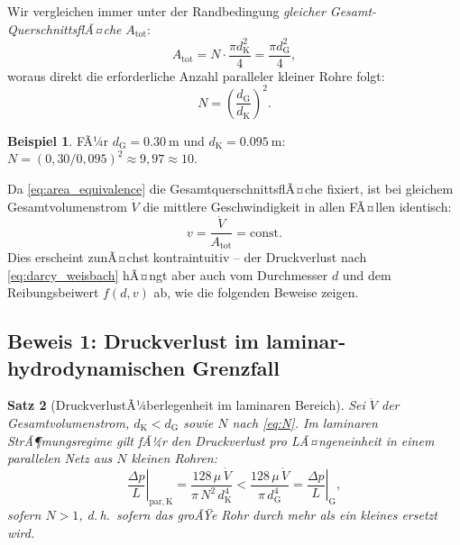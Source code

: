 ﻿\documentclass[12pt,a4paper,twoside]{article}
\theoremstyle{plain}
\newtheorem{theorem}{Satz}[section]
\theoremstyle{definition}
\newtheorem{example}[theorem]{Beispiel}
\theoremstyle{remark}
\newcommand{\dG}{d_{\mathrm{G}}}
\newcommand{\dK}{d_{\mathrm{K}}}
\begin{document}
Wir vergleichen immer unter der Randbedingung \emph{gleicher
Gesamt-QuerschnittsflÃ¤che} $A_{\mathrm{tot}}$:
\begin{equation}
  A_{\mathrm{tot}} = N \cdot \frac{\pi \dK^2}{4}
    = \frac{\pi \dG^2}{4},
  \label{eq:area_equivalence}
\end{equation}
woraus direkt die erforderliche Anzahl paralleler kleiner Rohre folgt:
\begin{equation}
  N = \left(\frac{\dG}{\dK}\right)^2.
  \label{eq:N}
\end{equation}

\begin{example}
FÃ¼r $\dG = \SI{0.30}{\metre}$ und $\dK = \SI{0.095}{\metre}$:
$N = (0{,}30 / 0{,}095)^2 \approx 9{,}97 \approx 10$.
\end{example}

Da \cref{eq:area_equivalence} die GesamtquerschnittsflÃ¤che fixiert, ist bei
gleichem Gesamtvolumenstrom $\dot{V}$ die mittlere Geschwindigkeit in allen
FÃ¤llen identisch:
\begin{equation}
  v = \frac{\dot{V}}{A_{\mathrm{tot}}} = \mathrm{const}.
  \label{eq:same_velocity}
\end{equation}
Dies erscheint zunÃ¤chst kontraintuitiv -- der Druckverlust nach
\cref{eq:darcy_weisbach} hÃ¤ngt aber auch vom Durchmesser $d$ und dem
Reibungsbeiwert $f(d, v)$ ab, wie die folgenden Beweise zeigen.

\subsection{Beweis 1: Druckverlust im laminar-hydrodynamischen Grenzfall}
\label{ssec:beweis_lam}

\begin{theorem}[DruckverlustÃ¼berlegenheit im laminaren Bereich]
\label{thm:druckverlust_lam}
Sei $\dot{V}$ der Gesamtvolumenstrom, $\dK < \dG$ sowie $N$ nach
\cref{eq:N}.
Im laminaren StrÃ¶mungsregime gilt fÃ¼r den Druckverlust pro LÃ¤ngeneinheit
in einem parallelen Netz aus $N$ kleinen Rohren:
\begin{equation}
  \left.\frac{\Delta p}{L}\right|_{\mathrm{par, K}}
  = \frac{128\,\mu\,\dot{V}}{\pi\,N^2\,\dK^4}
  < \frac{128\,\mu\,\dot{V}}{\pi\,\dG^4}
  = \left.\frac{\Delta p}{L}\right|_{\mathrm{G}},
  \label{eq:lam_druckverlust_vergleich}
\end{equation}
sofern $N > 1$, d.\,h.\ sofern das groÃŸe Rohr durch mehr als ein kleines
ersetzt wird.
\end{theorem}
\end{document}
